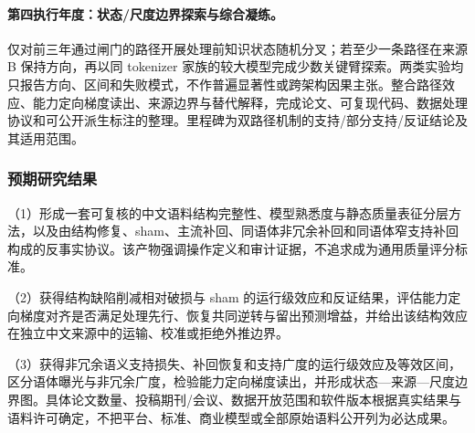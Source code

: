 \paragraph{第四执行年度：状态/尺度边界探索与综合凝练。}仅对前三年通过闸门的路径开展处理前知识状态随机分叉；若至少一条路径在来源 B 保持方向，再以同 tokenizer 家族的较大模型完成少数关键臂探索。两类实验均只报告方向、区间和失败模式，不作普遍显著性或跨架构因果主张。整合路径效应、能力定向梯度读出、来源边界与替代解释，完成论文、可复现代码、数据处理协议和可公开派生标注的整理。里程碑为双路径机制的支持/部分支持/反证结论及其适用范围。

\subsubsection{预期研究结果}

（1）形成一套可复核的中文语料结构完整性、模型熟悉度与静态质量表征分层方法，以及由结构修复、sham、主流补回、同语体非冗余补回和同语体窄支持补回构成的反事实协议。该产物强调操作定义和审计证据，不追求成为通用质量评分标准。

（2）获得结构缺陷削减相对破损与 sham 的运行级效应和反证结果，评估能力定向梯度对齐是否满足处理先行、恢复共同逆转与留出预测增益，并给出该结构效应在独立中文来源中的运输、校准或拒绝外推边界。

（3）获得非冗余语义支持损失、补回恢复和支持广度的运行级效应及等效区间，区分语体曝光与非冗余广度，检验能力定向梯度读出，并形成状态—来源—尺度边界图。具体论文数量、投稿期刊/会议、数据开放范围和软件版本根据真实结果与语料许可确定，不把平台、标准、商业模型或全部原始语料公开列为必达成果。
